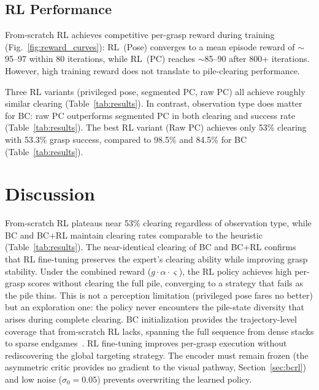 \documentclass[conference]{IEEEtran}
\begin{document}
\subsection{RL Performance}
\label{sec:rl_perf}
From-scratch RL achieves competitive per-grasp reward during training (Fig.~\ref{fig:reward_curves}): RL~(Pose) converges to a mean episode reward of $\sim$95--97 within 80 iterations, while RL~(PC) reaches $\sim$85--90 after 800+ iterations.
However, high training reward does not translate to pile-clearing performance.

Three RL variants (privileged pose, segmented PC, raw PC) all achieve roughly similar clearing (Table~\ref{tab:results}).
In contrast, observation type does matter for BC: raw PC outperforms segmented PC in both clearing and success rate (Table~\ref{tab:results}).
The best RL variant (Raw PC) achieves only 53\% clearing with 53.3\% grasp success, compared to 98.5\% and 84.5\% for BC (Table~\ref{tab:results}).

\section{Discussion}
From-scratch RL plateaus near 53\% clearing regardless of observation type, while BC and BC+RL maintain clearing rates comparable to the heuristic (Table~\ref{tab:results}). The near-identical clearing of BC and BC+RL confirms that RL fine-tuning preserves the expert's clearing ability while improving grasp stability.
Under the combined reward ($g \cdot \alpha \cdot \varsigma$), the RL policy achieves high per-grasp scores without clearing the full pile, converging to a strategy that fails as the pile thins. This is not a perception limitation (privileged pose fares no better) but an exploration one: the policy never encounters the pile-state diversity that arises during complete clearing.
BC initialization provides the trajectory-level coverage that from-scratch RL lacks, spanning the full sequence from dense stacks to sparse endgames~\cite{rajeswaran2018learning}. RL fine-tuning improves per-grasp execution without rediscovering the global targeting strategy. The encoder must remain frozen (the asymmetric critic provides no gradient to the visual pathway, Section~\ref{sec:bcrl}) and low noise ($\sigma_0 = 0.05$) prevents overwriting the learned policy.
\end{document}
